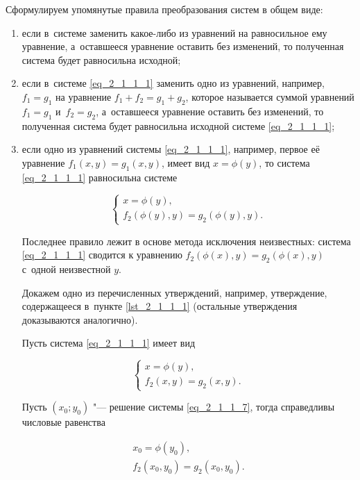 Сформулируем упомянутые правила преобразования систем в общем виде:
\begin{enumerate}
\item \label{lst_2_1_1_1} если в~системе заменить какое-либо из уравнений на равносильное
ему уравнение, а~оставшееся уравнение оставить без изменений,
то полученная система будет равносильна исходной;

\item \label{lst_2_1_1_2} если в~системе \eqref{eq_2_1_1_1} заменить одно из уравнений, например,
$f_{1} = g_{1}$ на уравнение $f_{1} + f_{2} = g_{1} + g_{2}$,
которое называется суммой уравнений $f_{1} = g_{1}$ и~$f_{2} = g_{2}$,
а~оставшееся уравнение оставить без изменений, то полученная система будет
равносильна исходной системе \eqref{eq_2_1_1_1};

\item \label{lst_2_1_1_3} если одно из уравнений системы \eqref{eq_2_1_1_1}, например,
первое её уравнение $f_{1}(x, y) = g_{1}(x, y)$, имеет вид $x = \phi(y)$,
то система \eqref{eq_2_1_1_1} равносильна системе

\begin{equation}\label{eq_2_1_1_6}
\begin{cases}
x = \phi(y), \\
f_{2}(\phi(y), y) = g_{2}(\phi(y), y).
\end{cases}
\end{equation}

Последнее правило лежит в основе метода исключения неизвестных:
система \eqref{eq_2_1_1_1} сводится к уравнению
$f_{2}(\phi(x), y) = g_{2}(\phi(x), y)$ с~одной неизвестной $y$.

Докажем одно из перечисленных утверждений, например, утверждение,
содержащееся в~пункте \ref{lst_2_1_1_1} (остальные утверждения доказываются
аналогично).

Пусть система \eqref{eq_2_1_1_1} имеет вид

\begin{equation}\label{eq_2_1_1_7}
\begin{cases}
x = \phi(y), \\
f_{2}(x, y) = g_{2}(x, y).
\end{cases}
\end{equation}

Пусть $(x_{0}; y_{0})$ "--- решение системы \eqref{eq_2_1_1_7},
тогда справедливы числовые равенства

\begin{gather}
x_{0} = \phi(y_{0}), \label{eq_2_1_1_8} \\
f_{2}(x_{0}, y_{0}) = g_{2}(x_{0}, y_{0}). \label{eq_2_1_1_9}
\end{gather}


\end{enumerate}
